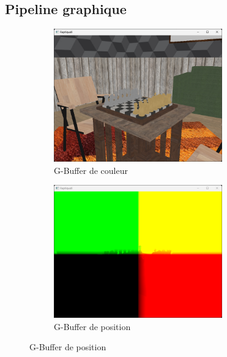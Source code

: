 \subsection{Pipeline graphique}
    \label{sec:graphics_pipeline}
    \begin{figure}[H]
        \begin{subfigure}{0.5\textwidth}
            \centering
            \includegraphics[width=0.8\textwidth]{images/raptiquax_rendering_gbuffer_albedo.png}
            \caption{G-Buffer de couleur}
            \label{fig:graphics_pipeline_gbuffer_albedo}
        \end{subfigure}
        \begin{subfigure}{0.5\textwidth}
            \centering
            \includegraphics[width=0.8\textwidth]{images/raptiquax_rendering_gbuffer_position.png}
            \caption{G-Buffer de position}
            \label{fig:graphics_pipeline_gbuffer_position}
        \end{subfigure}

\end{figure}
